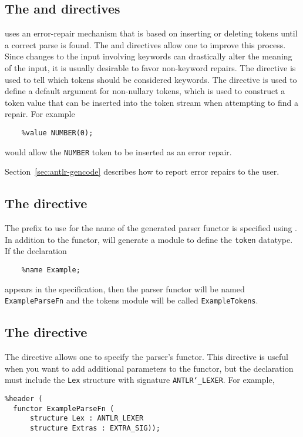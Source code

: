 \subsection{The  and  directives}

\Antlr{} uses an error-repair mechanism that is based on inserting or deleting tokens until
a correct parse is found.
The  and  directives allow one to improve this process.
Since changes to the input involving keywords can drastically alter the meaning of the
input, it is usually desirable to favor non-keyword repairs.
The  directive is used to tell \antlr{} which tokens should be considered keywords.
The  directive is used to define a default argument for non-nullary tokens, which
is used to construct a token value that can be inserted into the token stream
when attempting to find a repair.
For example
\begin{verbatim}
    %value NUMBER(0);
\end{verbatim}
would allow the \texttt{NUMBER} token to be inserted as an error repair.

Section~\ref{sec:antlr-gencode} describes how to report error repairs to the user.

\subsection{The  directive}

The prefix to use for the name of the generated parser functor is specified using .
In addition to the functor, \antlr{} will generate a module to define the \texttt{token} datatype.
If the declaration
\begin{verbatim}
    %name Example;
\end{verbatim}
appears in the specification, then the parser functor will be named
\texttt{ExampleParseFn} and the tokens module will be called \texttt{ExampleTokens}.

\subsection{The  directive}
The  directive allows one to specify the parser's functor.
This directive is useful when you want to add additional parameters to the functor,
but the declaration must include the \texttt{Lex} structure with signature
\texttt{ANTLR\char`\_LEXER}.
For example,
\begin{lstlisting}
%header (
  functor ExampleParseFn (
      structure Lex : ANTLR_LEXER
      structure Extras : EXTRA_SIG));
\end{lstlisting}%

